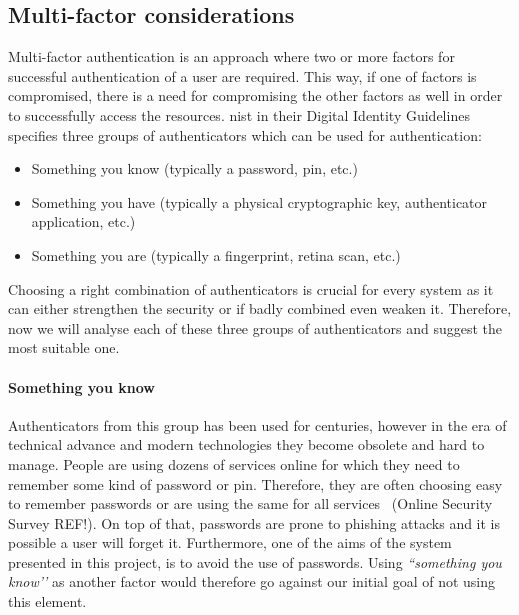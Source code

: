 \subsection{Multi-factor considerations} \label{multiFA}

Multi-factor authentication is an approach where two or more factors for successful authentication of a user are required. This way, if one of factors is compromised, there is a need for compromising the other factors as well in order to successfully access the resources. \acrshort{nist} in their Digital Identity Guidelines~\cite{Grassi2017Digital3} specifies three groups of authenticators which can be used for authentication:
\begin{itemize}[noitemsep]
    \item Something you know (typically a password, \acrshort{pin}, etc.)
    \item Something you have (typically a physical cryptographic key, authenticator application, etc.)
    \item Something you are (typically a fingerprint, retina scan, etc.)
\end{itemize}

Choosing a right combination of authenticators is crucial for every system as it can either strengthen the security or if badly combined even weaken it. Therefore, now we will analyse each of these three groups of authenticators and suggest the most suitable one.

\paragraph{Something you know}
Authenticators from this group has been used for centuries, however in the era of technical advance and modern technologies they become obsolete and hard to manage. People are using dozens of services online for which they need to remember some kind of password or \acrshort{pin}. Therefore, they are often choosing easy to remember passwords or are using the same for all services~\cite{} (Online Security Survey REF!). On top of that, passwords are prone to phishing attacks and it is possible a user will forget it. Furthermore, one of the aims of the system presented in this project, is to avoid the use of passwords. Using\textit{ ``something you know’’} as another factor would therefore go against our initial goal of not using this element.

